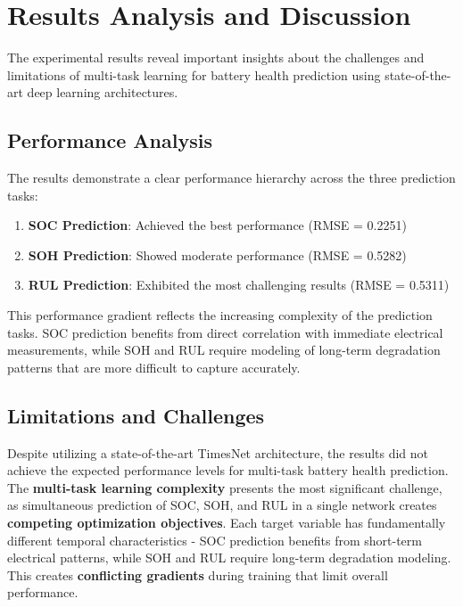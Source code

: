 \section{Results Analysis and Discussion}
\label{sec:results_discussion}

The experimental results reveal important insights about the challenges and limitations of multi-task learning for battery health prediction using state-of-the-art deep learning architectures.

\subsection{Performance Analysis}
\label{subsec:performance_analysis}

The results demonstrate a clear performance hierarchy across the three prediction tasks:

\begin{enumerate}
    \item \textbf{SOC Prediction}: Achieved the best performance (RMSE = 0.2251)
    \item \textbf{SOH Prediction}: Showed moderate performance (RMSE = 0.5282)
    \item \textbf{RUL Prediction}: Exhibited the most challenging results (RMSE = 0.5311)
\end{enumerate}

This performance gradient reflects the increasing complexity of the prediction tasks. SOC prediction benefits from direct correlation with immediate electrical measurements, while SOH and RUL require modeling of long-term degradation patterns that are more difficult to capture accurately.

\subsection{Limitations and Challenges}
\label{subsec:limitations}

Despite utilizing a state-of-the-art TimesNet architecture, the results did not achieve the expected performance levels for multi-task battery health prediction. The \textbf{multi-task learning complexity} presents the most significant challenge, as simultaneous prediction of SOC, SOH, and RUL in a single network creates \textbf{competing optimization objectives}. Each target variable has fundamentally different temporal characteristics - SOC prediction benefits from short-term electrical patterns, while SOH and RUL require long-term degradation modeling. This creates \textbf{conflicting gradients} during training that limit overall performance.

